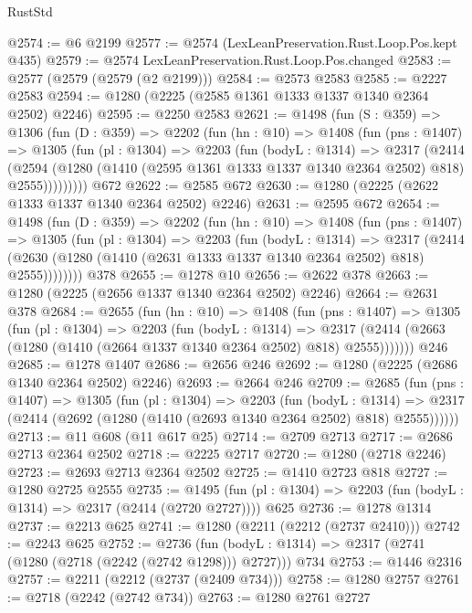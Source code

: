 \begin{lexlean}{RustStd}
\begin{coremodule}
{\begin{coremodule}
{{{{{{{{{{{{@2574 := @6 @2199
@2577 := @2574 (LexLeanPreservation.Rust.Loop.Pos.kept @435)
@2579 := @2574 LexLeanPreservation.Rust.Loop.Pos.changed
@2583 := @2577 (@2579 (@2579 (@2 @2199)))
@2584 := @2573 @2583
@2585 := @2227 @2583
@2594 := @1280 (@2225 (@2585 @1361 @1333 @1337 @1340 @2364 @2502) @2246)
@2595 := @2250 @2583
@2621 := @1498
    (fun (S : @359) =>
    @1306
      (fun (D : @359) =>
      @2202
        (fun (hn : @10) =>
        @1408
          (fun (pns : @1407) =>
          @1305
            (fun (pl : @1304) =>
            @2203
              (fun (bodyL : @1314) =>
              @2317
                (@2414
                  (@2594
                    (@1280 (@1410 (@2595 @1361 @1333 @1337 @1340 @2364 @2502) @818) @2555)))))))))
    @672
@2622 := @2585 @672
@2630 := @1280 (@2225 (@2622 @1333 @1337 @1340 @2364 @2502) @2246)
@2631 := @2595 @672
@2654 := @1498
    (fun (D : @359) =>
    @2202
      (fun (hn : @10) =>
      @1408
        (fun (pns : @1407) =>
        @1305
          (fun (pl : @1304) =>
          @2203
            (fun (bodyL : @1314) =>
            @2317
              (@2414 (@2630 (@1280 (@1410 (@2631 @1333 @1337 @1340 @2364 @2502) @818) @2555))))))))
    @378
@2655 := @1278 @10
@2656 := @2622 @378
@2663 := @1280 (@2225 (@2656 @1337 @1340 @2364 @2502) @2246)
@2664 := @2631 @378
@2684 := @2655
    (fun (hn : @10) =>
    @1408
      (fun (pns : @1407) =>
      @1305
        (fun (pl : @1304) =>
        @2203
          (fun (bodyL : @1314) =>
          @2317 (@2414 (@2663 (@1280 (@1410 (@2664 @1337 @1340 @2364 @2502) @818) @2555)))))))
    @246
@2685 := @1278 @1407
@2686 := @2656 @246
@2692 := @1280 (@2225 (@2686 @1340 @2364 @2502) @2246)
@2693 := @2664 @246
@2709 := @2685
    (fun (pns : @1407) =>
    @1305
      (fun (pl : @1304) =>
      @2203
        (fun (bodyL : @1314) =>
        @2317 (@2414 (@2692 (@1280 (@1410 (@2693 @1340 @2364 @2502) @818) @2555))))))
@2713 := @11 @608 (@11 @617 @25)
@2714 := @2709 @2713
@2717 := @2686 @2713 @2364 @2502
@2718 := @2225 @2717
@2720 := @1280 (@2718 @2246)
@2723 := @2693 @2713 @2364 @2502
@2725 := @1410 @2723 @818
@2727 := @1280 @2725 @2555
@2735 := @1495 (fun (pl : @1304) => @2203 (fun (bodyL : @1314) => @2317 (@2414 (@2720 @2727)))) @625
@2736 := @1278 @1314
@2737 := @2213 @625
@2741 := @1280 (@2211 (@2212 (@2737 @2410)))
@2742 := @2243 @625
@2752 := @2736
    (fun (bodyL : @1314) => @2317 (@2741 (@1280 (@2718 (@2242 (@2742 @1298))) @2727)))
    @734
@2753 := @1446 @2316
@2757 := @2211 (@2212 (@2737 (@2409 @734)))
@2758 := @1280 @2757
@2761 := @2718 (@2242 (@2742 @734))
@2763 := @1280 @2761 @2727
}}}}}}}}}}}}
\end{coremodule}}
\end{coremodule}
\end{lexlean}
